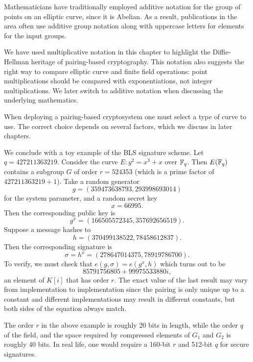 Mathematicians have traditionally employed additive notation for the group of
points on an elliptic curve, since it is Abelian. As a result, publications in
the area often use additive group notation along with uppercase letters for
elements for the input groups.

We have used multiplicative notation in this chapter to highlight the
Diffie-Hellman heritage of pairing-based cryptography. This notation also
suggests the right way to compare elliptic curve and finite field operations:
point multiplications should be compared with exponentiations, not integer
multiplications. We later switch to additive notation when discussing the
underlying mathematics.

When deploying a pairing-based cryptosystem one must select a type of curve to
use. The correct choice depends on several factors, which we discuss in later
chapters.

We conclude with a toy example of the BLS signature scheme.
Let $q = 427211363219$.
Consider the curve $E : y^2 = x^3 + x$ over
$\mathbb{F}_q$. Then $E(\mathbb{F}_q)$ contains a subgroup
$G$ of order $r = 524353$ (which is a prime factor of $427211363219 + 1$).
Take a random generator
\[ g = (359473638793, 293998693014) \]
for the system parameter, and a random secret key
\[ x = 66995 . \]
Then the corresponding public key is
\[ g^x = (166505572345, 357692656519) . \]
Suppose a message hashes to
\[ h = (370499138522, 78458612837) . \]
Then the corresponding signature is
\[ \sigma = h^x = (278647014375, 78919786700) . \]
To verify, we must check that $e(g, \sigma) = e(g^x , h)$
which turns out to be
\[ 85791756805 + 99975533880i , \]
an element of $K[i]$ that has order $r$.
The exact value of the last result may vary
from implementation to implementation since the pairing is only unique up to a
constant and different implementations may result in different constants,
but both sides of the equation always match.

The order $r$ in the above example is roughly 20 bits in length, while the
order $q$ of the field, and the space required by compressed elements of $G_1$
and $G_2$ is roughly 40 bits. In real life, one would require a 160-bit $r$ and
512-bit $q$ for secure signatures.
